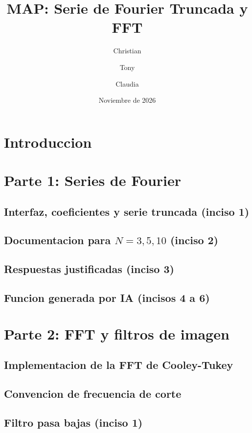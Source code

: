 \documentclass[11pt,letterpaper]{article}
\title{MAP: Serie de Fourier Truncada y FFT}
\author{Christian \and Tony \and Claudia}
\date{Noviembre de 2026}
\begin{document}
\maketitle

\section{Introduccion}

\section{Parte 1: Series de Fourier} %
\subsection{Interfaz, coeficientes y serie truncada (inciso 1)}
\subsection{Documentacion para $N=3,5,10$ (inciso 2)}
\subsection{Respuestas justificadas (inciso 3)}
\subsection{Funcion generada por IA (incisos 4 a 6)}

\section{Parte 2: FFT y filtros de imagen} %
\subsection{Implementacion de la FFT de Cooley-Tukey}
\subsection{Convencion de frecuencia de corte}
\subsection{Filtro pasa bajas (inciso 1)}
\end{document}
